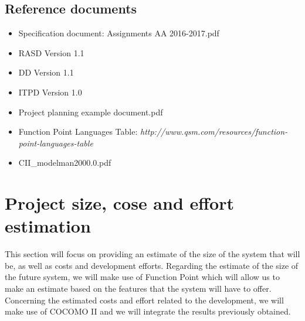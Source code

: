 \documentclass[10pt, a4paper,titlepage]{article}
\begin{document}
\subsection{Reference documents}
\begin{itemize}
\item Speciﬁcation document: Assignments AA 2016-2017.pdf
\item RASD Version 1.1    
\item DD Version 1.1
\item ITPD Version 1.0
\item Project planning example document.pdf
\item Function Point Languages Table: \emph{http://www.qsm.com/resources/function-point-languages-table}
\item CII\_modelman2000.0.pdf
\end{itemize}
\section{Project size, cose and effort estimation}
This section will focus on providing an estimate of the size of the system that will be, as well as costs and development efforts.
Regarding the estimate of the size of the future system, we will make use of Function Point which will allow us to make an estimate based on the features that the system will have to offer.
Concerning the estimated costs and effort related to the development, we will make use of COCOMO II and we will integrate the results previously obtained.
\end{document}

